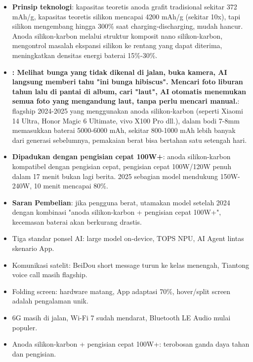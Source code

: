 \begin{itemize}
  \item \textbf{Prinsip teknologi}: kapasitas teoretis anoda grafit tradisional sekitar 372 mAh/g, kapasitas teoretis silikon mencapai 4200 mAh/g (sekitar 10x), tapi silikon mengembang hingga 300\% saat charging-discharging, mudah hancur. Anoda silikon-karbon melalui struktur komposit nano silikon-karbon, mengontrol masalah ekspansi silikon ke rentang yang dapat diterima, meningkatkan densitas energi baterai 15\%-30\%.
  \item \textbf{: Melihat bunga yang tidak dikenal di jalan, buka kamera, AI langsung memberi tahu "ini bunga hibiscus". Mencari foto liburan tahun lalu di pantai di album, cari "laut", AI otomatis menemukan semua foto yang mengandung laut, tanpa perlu mencari manual.}: flagship 2024-2025 yang menggunakan anoda silikon-karbon (seperti Xiaomi 14 Ultra, Honor Magic 6 Ultimate, vivo X100 Pro dll.), dalam bodi 7-8mm memasukkan baterai 5000-6000 mAh, sekitar 800-1000 mAh lebih banyak dari generasi sebelumnya, pemakaian berat bisa bertahan satu setengah hari.
  \item \textbf{Dipadukan dengan pengisian cepat 100W+}: anoda silikon-karbon kompatibel dengan pengisian cepat, pengisian cepat 100W/120W penuh dalam 17 menit bukan lagi berita. 2025 sebagian model mendukung 150W-240W, 10 menit mencapai 80\%.
  \item \textbf{Saran Pembelian}: jika pengguna berat, utamakan model setelah 2024 dengan kombinasi "anoda silikon-karbon + pengisian cepat 100W+", kecemasan baterai akan berkurang drastis.
\end{itemize}


\begin{itemize}
  \item Tiga standar ponsel AI: large model on-device, TOPS NPU, AI Agent lintas skenario App.
  \item Komunikasi satelit: BeiDou short message turun ke kelas menengah, Tiantong voice call masih flagship.
  \item Folding screen: hardware matang, App adaptasi 70\%, hover/split screen adalah pengalaman unik.
  \item 6G masih di jalan, Wi-Fi 7 sudah mendarat, Bluetooth LE Audio mulai populer.
  \item Anoda silikon-karbon + pengisian cepat 100W+: terobosan ganda daya tahan dan pengisian.
\end{itemize}

